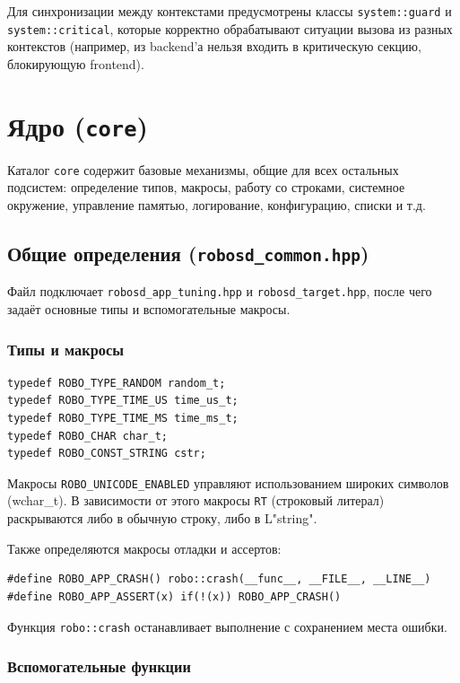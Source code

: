 \documentclass[a4paper,12pt]{article}
\begin{document}
Для синхронизации между контекстами предусмотрены классы \texttt{system::guard} и \texttt{system::critical}, которые корректно обрабатывают ситуации вызова из разных контекстов (например, из backend'а нельзя входить в критическую секцию, блокирующую frontend).

\section{Ядро (\texttt{core})}

Каталог \texttt{core} содержит базовые механизмы, общие для всех остальных подсистем: определение типов, макросы, работу со строками, системное окружение, управление памятью, логирование, конфигурацию, списки и т.д.

\subsection{Общие определения (\texttt{robosd\_common.hpp})}

Файл подключает \texttt{robosd\_app\_tuning.hpp} и \texttt{robosd\_target.hpp}, после чего задаёт основные типы и вспомогательные макросы.

\subsubsection{Типы и макросы}

\begin{lstlisting}[caption={Определения типов}]
typedef ROBO_TYPE_RANDOM random_t;
typedef ROBO_TYPE_TIME_US time_us_t;
typedef ROBO_TYPE_TIME_MS time_ms_t;
typedef ROBO_CHAR char_t;
typedef ROBO_CONST_STRING cstr;
\end{lstlisting}

Макросы \texttt{ROBO\_UNICODE\_ENABLED} управляют использованием широких символов (wchar\_t). В зависимости от этого макросы \texttt{RT} (строковый литерал) раскрываются либо в обычную строку, либо в L"string".

Также определяются макросы отладки и ассертов:
\begin{lstlisting}
#define ROBO_APP_CRASH() robo::crash(__func__, __FILE__, __LINE__)
#define ROBO_APP_ASSERT(x) if(!(x)) ROBO_APP_CRASH()
\end{lstlisting}

Функция \texttt{robo::crash} останавливает выполнение с сохранением места ошибки.

\subsubsection{Вспомогательные функции}
\end{document}
